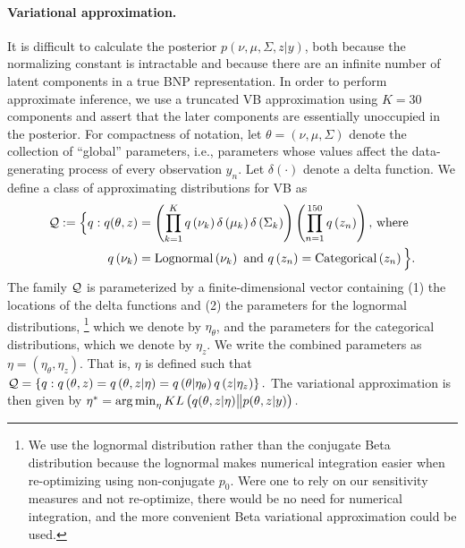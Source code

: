 %
\paragraph{Variational approximation.} It is difficult to calculate the
posterior $p\left(\nu, \mu, \Sigma, z \vert y\right)$, both because the
normalizing constant is intractable and because there are an infinite number of
latent components in a true BNP representation. In order to perform approximate
inference, we use a truncated VB approximation using $K=30$
components \citep{blei:2006:dirichletbnp} and assert that the later components are
essentially unoccupied in the posterior. For compactness of notation, let $\theta =
\left(\nu, \mu, \Sigma\right)$ denote the collection of ``global'' parameters,
i.e., parameters whose values affect the data-generating process of every
observation $y_n$.   Let $\delta\left(\cdot\right)$ denote a delta function. We
define a class of approximating distributions for VB as
%
\begin{align*}
\mathcal{Q} := \Big\{ q:
q(\theta, z) &=
\left(\prod_{k=1}^{K}q\left(\nu_{k}\right)\delta\left(\mu_{k}\right)
    \delta\left(\Sigma_{k}\right)\right)
    \left(\prod_{n=1}^{150}q\left(z_{n}\right) \right)\textrm{, where } \\
q\left(\nu_{k}\right) &= \mathrm{Lognormal}\left(\nu_k\right) \textrm{ and }
q\left(z_n\right) = \mathrm{Categorical}\left(z_n\right)
\Big\}.
\end{align*}
%
The family $\mathcal{Q}$ is parameterized by a finite-dimensional vector containing
(1) the locations of the delta functions and (2) the parameters for the lognormal
distributions,
\footnote{We use the lognormal distribution rather than the conjugate Beta
distribution because the lognormal makes numerical integration easier when
re-optimizing using non-conjugate $p_{0}$.  Were one to rely on our
sensitivity measures and not re-optimize, there would be no need for numerical
integration, and the more convenient Beta variational approximation could be
used.}
%
which we denote by $\eta_\theta$, and the parameters for the
categorical distributions, which we denote by $\eta_z$. We write the combined
parameters as $\eta=\left(\eta_\theta, \eta_z\right)$. That is, $\eta$ is
defined such that
%
$\mathcal{Q} =
    \left\{q: q\left(\theta, z\right) =
            q\left(\theta, z \vert \eta \right) =
            q\left(\theta \vert \eta_\theta \right)
            q\left(z \vert \eta_z \right)
    \right\}.$
%
The variational approximation is then given by
%
$
\etaopt = \argmin_{\eta} KL\left(
    q(\theta, z \vert \eta) \big\| p(\theta, z | y)
    \right). %
$

